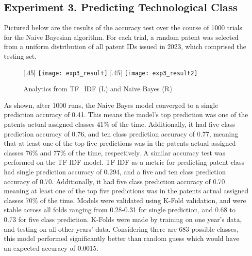 \documentclass{article}
\begin{document}
\subsection{Experiment 3. Predicting Technological Class}
Pictured below are the results of the accuracy test over the course of 1000 trials for the Naive Bayesian algorithm.  For each trial, a random patent was selected from a uniform distribution of all patent IDs issued in 2023, which comprised the testing set.

\begin{figure}[ht]
  [.45\linewidth]{%
    \texttt{[image: exp3\_result]}%
  }%
  \hfill
  [.45\linewidth]{%
    \texttt{[image: exp3\_result2]}%
  }
  \caption{Analytics from TF\_IDF (L) and Naive Bayes (R)}
  \label{fig:exp3_result}
\end{figure}


As shown, after 1000 runs, the Naive Bayes model converged to a single prediction accuracy of 0.41.  This means the model’s top prediction was one of the patents actual assigned classes 41\% of the time. Additionally, it had five class prediction accuracy of 0.76, and ten class prediction accuracy of 0.77, meaning that at least one of the top five predictions was in the patents actual assigned classes 76\% and 77\% of the time, respectively.  A similar accuracy test was performed on the TF-IDF model.  TF-IDF as a metric for predicting patent class had single prediction accuracy of 0.294, and a five and ten class prediction accuracy of 0.70. Additionally, it had five class prediction accuracy of 0.70 meaning at least one of the top five predictions was in the patents actual assigned classes 70\% of the time. Models were validated using K-Fold validation, and were stable across all folds ranging from 0.28-0.31 for single prediction, and 0.68 to 0.73 for five class prediction. K-Folds were made by training on one year's data, and testing on all other years' data. Considering there are 683 possible classes, this model performed significantly better than random guess which would have an expected accuracy of 0.0015. 
\end{document}
